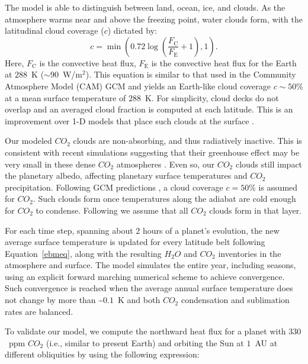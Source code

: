 \documentclass[fleqn,usenatbib]{mnras}
\begin{document}
The model is able to distinguish between land, ocean, ice, and clouds. As the atmosphere warms near and above the freezing point, water clouds form, with the latitudinal cloud coverage ($c$) dictated by:
\begin{equation}
\label{cloud_coverage}
    c = \min \left ( 0.72 \log \left( \frac{F_{\mathrm{C}}}{F_{\mathrm{E}}} + 1 \right ),1 \right ).
\end{equation}
Here, $F_\mathrm{C}$ is the convective heat flux, $F_\mathrm{E}$ is the convective heat flux for the Earth at $288$~K ($\sim 90$~W/m$^2$). This equation is similar to that used in the Community Atmosphere Model (CAM) GCM \citep{xu1991, yang2014} and yields an Earth-like cloud coverage $c\sim 50 \%$ at a mean surface temperature of $288$~K. For simplicity, cloud decks do not overlap and an averaged cloud fraction is computed at each latitude. This is an improvement over 1-D models that place such clouds at the surface \citep{kasting1993, KumarKopparapu2013}. 

Our modeled $CO_{\mathrm{2}}$ clouds are non-absorbing, and thus radiatively inactive. This is consistent with recent simulations suggesting that their greenhouse effect may be very small in these dense $CO_{\mathrm{2}}$ atmospheres \citep{kitzmann2016}. Even so, our $CO_{\mathrm{2}}$ clouds still impact the planetary albedo, affecting planetary surface temperatures and $CO_{\mathrm{2}}$ precipitation. Following GCM predictions \citep{forget2013}, a cloud coverage $c=50 \%$ is assumed for $CO_{\mathrm{2}}$. Such clouds form once temperatures along the adiabat are cold enough for $CO_{\mathrm{2}}$ to condense. Following \citep{Williams1997} we assume that all $CO_{\mathrm{2}}$ clouds form in that layer. 


For each time step, spanning about $2$ hours of a planet's evolution, the new average surface temperature is updated for every latitude belt following Equation~\ref{ebmeq}, along with the resulting $H_{\mathrm{2}}O$ and $CO_{\mathrm{2}}$ inventories in the atmosphere and surface. The model simulates the entire year, including seasons, using an explicit forward marching numerical scheme to achieve convergence. Such convergence is reached when the average annual surface temperature does not change by more than \textasciitilde$0.1$~K and both $CO_{\mathrm{2}}$ condensation and sublimation rates are balanced. 

To validate our model, we compute the northward heat flux for a planet with $330$~ppm $CO_{\mathrm{2}}$ (i.e., similar to present Earth) and orbiting the Sun at $1$~AU at different obliquities by using the following expression:
\end{document}
